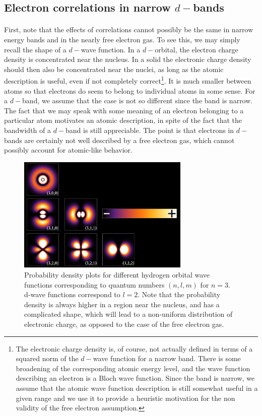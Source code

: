 \documentclass[10pt, twocolumn, twoside]{article}
\begin{document}
\subsection{Electron correlations in narrow $d-$bands}\paragraph{}

First, note that the effects of correlations cannot possibly be the same in narrow energy bands and in the nearly free electron gas. To see this, we may simply  recall the shape of a $d-$wave function. In a $d-$orbital, the electron charge density is concentrated near the nucleus. In a solid the electronic charge density should then also be concentrated near the nuclei, as long as the atomic description is useful, even if not completely correct\footnote{The electronic charge density is, of course, not actually defined in terms of a squared norm of the $d-$wave function for a narrow band. There is some broadening of the corresponding atomic energy level, and the wave function describing an electron is a Bloch wave function. Since the band is narrow, we assume that the atomic wave function description is still somewhat useful in a given range and we use it to provide a heuristic motivation for the non validity of the free electron assumption.}. It is much smaller between atoms so that electrons do seem to belong to individual atoms in some sense. For a $d-$band, we assume that the case is not so different since the band is narrow. The fact that we may speak with some meaning of an electron belonging to a particular atom motivates an atomic description, in spite of the fact that the bandwidth of a $d-$band is still appreciable. The point is that electrons in $d-$bands are certainly not well described by a free electron gas, which cannot possibly account for atomic-like behavior.

\begin{figure}[ht!]\label{fig:hydrogenWF}
\centering
\includegraphics[width = 8.2cm]{Hydrogen_Density_Plots.png}
\caption{Probability density plots for different hydrogen orbital wave functions corresponding to quantum numbers $(n, l, m)$ for $n = 3$. d-wave functions correspond to $l=2$. Note that the probability density is always higher in a region near the nucleus, and has a complicated shape, which will lead to a non-uniform distribution of electronic charge, as opposed to the case of the free electron gas.}
\end{figure}
\end{document}

